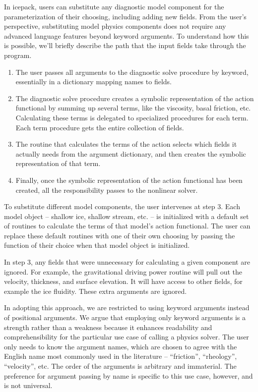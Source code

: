 \documentclass[journal abbreviation, manuscript]{copernicus}
\begin{document}
In icepack, users can substitute any diagnostic model component for the parameterization of their choosing, including adding new fields.
From the user's perspective, substituting model physics components does not require any advanced language features beyond keyword arguments.
To understand how this is possible, we'll briefly describe the path that the input fields take through the program.
\begin{enumerate}
    \item The user passes all arguments to the diagnostic solve procedure by keyword, essentially in a dictionary mapping names to fields.
    \item The diagnostic solve procedure creates a symbolic representation of the action functional by summing up several terms, like the viscosity, basal friction, etc.
        Calculating these terms is delegated to specialized procedures for each term.
        Each term procedure gets the entire collection of fields.
    \item The routine that calculates the terms of the action selects which fields it actually needs from the argument dictionary, and then creates the symbolic representation of that term.
    \item Finally, once the symbolic representation of the action functional has been created, all the responsibility passes to the nonlinear solver.
\end{enumerate}
To substitute different model components, the user intervenes at step 3.
Each model object -- shallow ice, shallow stream, etc. -- is initialized with a default set of routines to calculate the terms of that model's action functional.
The user can replace these default routines with one of their own choosing by passing the function of their choice when that model object is initialized.

In step 3, any fields that were unnecessary for calculating a given component are ignored.
For example, the gravitational driving power routine will pull out the velocity, thickness, and surface elevation.
It will have access to other fields, for example the ice fluidity.
These extra arguments are ignored.

In adopting this approach, we are restricted to using keyword arguments instead of positional arguments.
We argue that employing only keyword arguments is a strength rather than a weakness because it enhances readability and comprehensibility for the particular use case of calling a physics solver.
The user only needs to know the argument names, which are chosen to agree with the English name most commonly used in the literature -- ``friction'', ``rheology'', ``velocity'', etc.
The order of the arguments is arbitrary and immaterial.
The preference for argument passing by name is specific to this use case, however, and is not universal.
\end{document}
